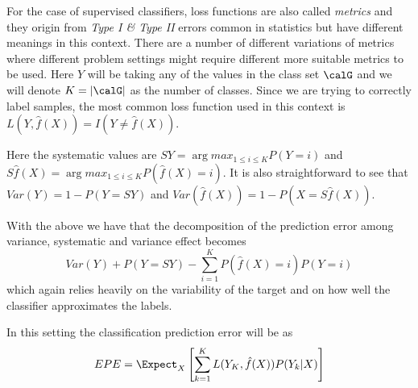 
 


For the case of supervised classifiers, loss functions are also called \textit{metrics} and they origin from \textit{Type I \& Type II} errors common in statistics but have different meanings in this context.  There are a number of different variations of metrics where different problem settings might require different more suitable metrics to be used. Here $Y$ will be taking any of the values in the class set $\calG$ and we will denote $K = |\calG|$ as the number of classes. Since we are trying to correctly label samples, the most common loss function used in this context is $L(Y, \hat{f}(X)) = I(Y \neq \hat{f}(X))$. 

Here the systematic values are  $SY = \arg max_{1\leq i \leq K} P(Y=i)$ and $S\hat{f}(X) = \arg max_{1\leq i \leq K} P(\hat{f}(X)=i)$. It is also straightforward to see that $Var(Y) = 1 - P(Y=SY)$ and $Var(\hat{f}(X)) = 1 -  P(X = S\hat{f}(X)) $. 

With the above we have that the decomposition of the prediction error among variance, systematic and variance effect becomes
$$Var(Y) + P(Y=SY)  - \sum_{i=1}^K P(\hat{f}(X) =i)P(Y=i)$$ which again relies heavily on the variability of the target and on how well the classifier approximates the labels.


In this setting the classification prediction error will be as
\begin{equation}\label{classificationEPE}
EPE = \Expect_X\left[ \sum_{k=1}^{K} L( Y_K , \hat{f}(X) ) P(Y_k|X) \right]
\end{equation}


